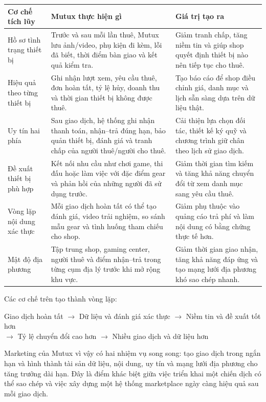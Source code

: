 \begin{longtable}{@{}p{}p{}p{}@{}}
\toprule
\textbf{Cơ chế tích lũy} & \textbf{Mutux thực hiện gì} & \textbf{Giá trị tạo ra} \\
\midrule
\endhead
Hồ sơ tình trạng thiết bị & Trước và sau mỗi lần thuê, Mutux lưu ảnh/video, phụ kiện đi kèm, lỗi đã biết, thời điểm bàn giao và kết quả kiểm tra. & Giảm tranh chấp, tăng niềm tin và giúp shop quyết định thiết bị nào nên tiếp tục cho thuê. \\
Hiệu quả theo từng thiết bị & Ghi nhận lượt xem, yêu cầu thuê, đơn hoàn tất, tỷ lệ hủy, doanh thu và thời gian thiết bị không được thuê. & Tạo báo cáo để shop điều chỉnh giá, danh mục và lịch sẵn sàng dựa trên dữ liệu thật. \\
Uy tín hai phía & Sau giao dịch, hệ thống ghi nhận thanh toán, nhận--trả đúng hạn, bảo quản thiết bị, đánh giá và tranh chấp của người thuê/người cho thuê. & Cải thiện lựa chọn đối tác, thiết kế ký quỹ và chương trình giữ chân theo lịch sử giao dịch. \\
Đề xuất thiết bị phù hợp & Kết nối nhu cầu như chơi game, thi đấu hoặc làm việc với đặc điểm gear và phản hồi của những người đã sử dụng trước. & Giảm thời gian tìm kiếm và tăng khả năng chuyển đổi từ xem danh mục sang yêu cầu thuê. \\
Vòng lặp nội dung xác thực & Mỗi giao dịch hoàn tất có thể tạo đánh giá, video trải nghiệm, so sánh mẫu gear và tình huống tham chiếu cho shop. & Giảm phụ thuộc vào quảng cáo trả phí và làm nội dung có bằng chứng thực tế hơn. \\
Mật độ địa phương & Tập trung shop, gaming center, người thuê và điểm nhận--trả trong từng cụm địa lý trước khi mở rộng khu vực. & Giảm thời gian giao nhận, tăng khả năng đáp ứng và tạo mạng lưới địa phương khó sao chép nhanh. \\
\bottomrule
\end{longtable}

Các cơ chế trên tạo thành vòng lặp:

\begin{center}
\small
Giao dịch hoàn tất $\rightarrow$ Dữ liệu và đánh giá xác thực $\rightarrow$ Niềm tin và đề xuất tốt hơn \\
$\rightarrow$ Tỷ lệ chuyển đổi cao hơn $\rightarrow$ Nhiều giao dịch và dữ liệu hơn
\end{center}

Marketing của Mutux vì vậy có hai nhiệm vụ song song: tạo giao dịch trong ngắn hạn và hình thành tài sản dữ liệu, nội dung, uy tín và mạng lưới địa phương cho tăng trưởng dài hạn. Đây là điểm khác biệt giữa việc triển khai một chiến dịch có thể sao chép và việc xây dựng một hệ thống marketplace ngày càng hiệu quả sau mỗi giao dịch.

